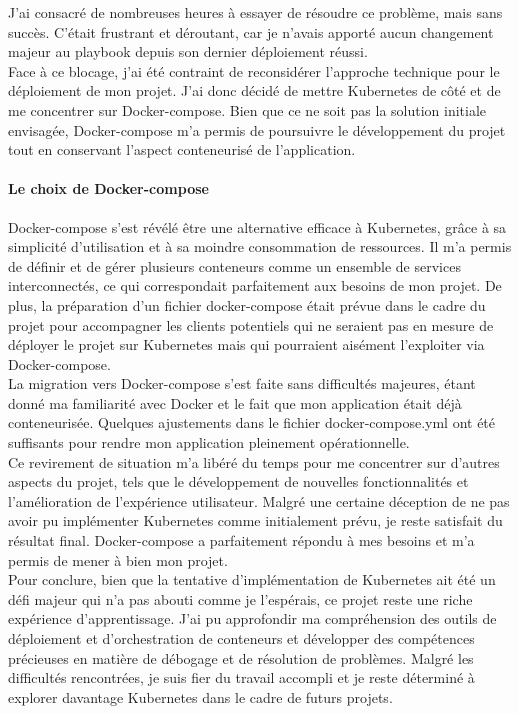 J'ai consacré de nombreuses heures à essayer de résoudre ce problème, mais sans succès.
C'était frustrant et déroutant, car je n'avais apporté aucun changement majeur au playbook depuis son dernier déploiement réussi.\\

Face à ce blocage, j'ai été contraint de reconsidérer l'approche technique pour le déploiement de mon projet.
J'ai donc décidé de mettre Kubernetes de côté et de me concentrer sur Docker-compose.
Bien que ce ne soit pas la solution initiale envisagée,
Docker-compose m'a permis de poursuivre le développement du projet tout en conservant l'aspect conteneurisé de l'application.\\

\paragraph{Le choix de Docker-compose}


Docker-compose s'est révélé être une alternative efficace à Kubernetes, grâce à sa simplicité d'utilisation et à sa moindre consommation de ressources.
Il m'a permis de définir et de gérer plusieurs conteneurs comme un ensemble de services interconnectés, ce qui correspondait parfaitement aux besoins de mon projet.
De plus, la préparation d'un fichier docker-compose était prévue dans le cadre du projet pour accompagner les clients
potentiels qui ne seraient pas en mesure de déployer le projet sur Kubernetes mais qui pourraient aisément l'exploiter via Docker-compose.\\

La migration vers Docker-compose s'est faite sans difficultés majeures, étant donné ma familiarité avec Docker et le fait que mon application était déjà conteneurisée.
Quelques ajustements dans le fichier docker-compose.yml ont été suffisants pour rendre mon application pleinement opérationnelle.\\

Ce revirement de situation m'a libéré du temps pour me concentrer sur d'autres aspects du projet,
tels que le développement de nouvelles fonctionnalités et l'amélioration de l'expérience utilisateur.
Malgré une certaine déception de ne pas avoir pu implémenter Kubernetes comme initialement prévu, je reste satisfait du résultat final.
Docker-compose a parfaitement répondu à mes besoins et m'a permis de mener à bien mon projet.\\

Pour conclure, bien que la tentative d'implémentation de Kubernetes ait été un défi majeur qui n'a pas abouti comme je l'espérais,
ce projet reste une riche expérience d'apprentissage.
J'ai pu approfondir ma compréhension des outils de déploiement et d'orchestration de conteneurs et développer des compétences précieuses en matière de débogage et de résolution de problèmes.
Malgré les difficultés rencontrées, je suis fier du travail accompli et je reste déterminé à explorer davantage Kubernetes dans le cadre de futurs projets.\\

